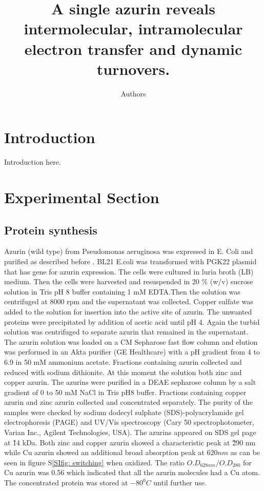 \documentclass[journal=jacsat,manuscript=article]{achemso}
\author{Authors}
\affiliation{Huygens-Kamerlingh Onnes Laboratory, Leiden University, RA, Leiden, The Netherlands}
\title[]
{A single azurin reveals intermolecular, intramolecular electron transfer and dynamic turnovers.}
\begin{document}
\section{Introduction}
Introduction here.
\section{Experimental Section}
\subsection{Protein synthesis}
Azurin (wild type) from Pseudomonas aeruginosa was expressed in E. Coli and purified as described before \citep{kamp1990purification}. BL21 E.coli was transformed with PGK22 plasmid that has gene for azurin expression. The cells were cultured in luria broth (LB) medium. Then the cells were harvested and resuspended in 20 \% (w/v) sucrose solution in Tris pH 8 buffer containing 1 mM EDTA.Then the solution was centrifuged at 8000 rpm and the supernatant was collected. Copper sulfate was added to the solution for insertion into the active site of azurin. The unwanted proteins were precipitated by addition of acetic acid until pH 4. Again the turbid solution was centrifuged to separate azurin that remained in the supernatant. The azurin solution was loaded on a CM Sepharose fast flow column and elution was performed in an Akta purifier (GE Healthcare) with a pH gradient from 4 to 6.9 in 50 mM ammonium acetate. Fractions containing azurin collected and reduced with sodium dithionite. At this moment the solution both zinc and copper azurin. The azurins were purified in a DEAE sepharose column by a salt gradient of 0 to 50 mM NaCl in Tris pH8 buffer. Fractions containing copper azurin and zinc azurin collected and concentrated separately. The purity of the samples were checked by sodium dodecyl sulphate (SDS)-polyacrylamide gel electrophoresis (PAGE) and UV/Vis spectroscopy (Cary 50 spectrophotometer, Varian Inc., Agilent Technologies, USA). The azurins appeared on SDS gel page at \~14 kDa. Both zinc and copper azurin showed a characteristic peak at \~290 nm while Cu azurin showed an additional broad absorption peak at $620 nm$ as can be seen in figure S\ref{SIfig: switching} when oxidized. The ratio $O.D_{628 nm}/O.D_{280}$ for Cu azurin was 0.56 which indicated that all the azurin molecules had a Cu atom. The concentrated protein was stored at $-80^0 C$ until further use.
\end{document}
